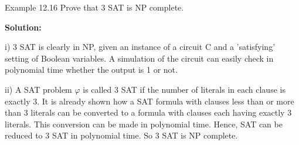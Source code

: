 \documentclass [12pt]{beamer}
\begin{document}
\begin{frame}
	
Example 12.16 Prove that 3 SAT is NP complete.


\textbf{Solution:}


i) 3 SAT is clearly in NP, given an instance of a circuit $\mathrm{C}$ and a 'satisfying' setting of Boolean variables. A simulation of the circuit can easily check in polynomial time whether the output is 1 or not.


ii) A SAT problem $\varphi$ is called 3 SAT if the number of literals in each clause is exactly $3 .$ It is already shown how a SAT formula with clauses less than or more than 3 literals can be converted to a formula with clauses each having exactly 3 literals. This conversion can be made in polynomial time. Hence, SAT can be reduced to 3 SAT in polynomial time. So 3 SAT is NP complete.	
	
	
	
\end{frame}	
\end{document}
